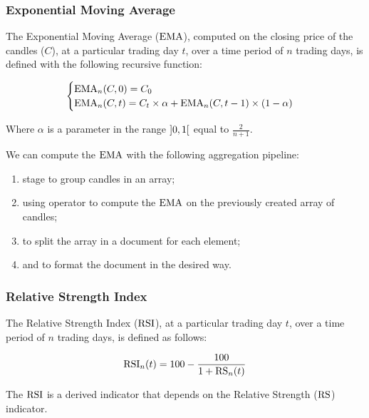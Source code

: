 \subsubsection{Exponential Moving Average}

The Exponential Moving Average (\(\operatorname{EMA}\)), computed on the closing price of the
candles (\(C\)), at a particular trading day \(t\), over a time period of \(n\)
trading days, is defined with the following recursive function:

\begin{equation}\label{eq:ema}
	\begin{cases}
		\operatorname{EMA}_n(C,0) = C_0\\
		\operatorname{EMA}_n(C,t) = C_t\times\alpha +
		\operatorname{EMA}_n(C,t-1)\times(1-\alpha)
	\end{cases}
\end{equation}

Where \(\alpha\) is a parameter in the range \(\interval[open]{0}{1}\)
equal to \(\frac{2}{n + 1}\).

We can compute the \(\operatorname{EMA}\) with the following aggregation pipeline:

\begin{enumerate}
	\item {} stage to group candles in an array;
	\item {} using  operator to compute the
		\(\operatorname{EMA}\) on the previously created array of candles;
	\item {} to split the array in a document for each element;
	\item {} and  to format the document
		in the desired way.
\end{enumerate}

\subsubsection{Relative Strength Index}

The Relative Strength Index (\(\operatorname{RSI}\)), at a particular trading day \(t\), over
a time period of \(n\) trading days, is defined as follows:

\begin{equation}\label{eq:rsi}
	\operatorname{RSI}_n(t) = 100 - \frac{100}{1 + \operatorname{RS}_n(t)}
\end{equation}

The \(\operatorname{RSI}\) is a derived indicator that depends on the Relative Strength
(\(\operatorname{RS}\)) indicator.

